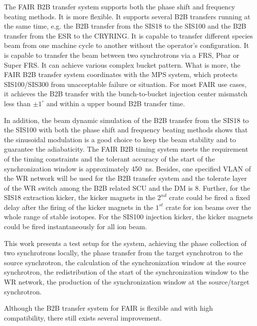 The FAIR B2B transfer system supports both the phase shift and frequency beating methods. It is more flexible. It supports several B2B transfers running at the same time, e.g. the B2B transfer from the SIS18 to the SIS100 and the B2B transfer from the ESR to the CRYRING. It is capable to transfer different species beam from one machine cycle to another without the operator’s configuration. It is capable to transfer the beam between two synchrotrons via a FRS, Pbar or Super FRS. It can achieve various complex bucket pattern. What is more, the FAIR B2B transfer system coordinates with the MPS system, which protects SIS100/SIS300 from unacceptable failure or situation. For most FAIR use cases, it achieves the B2B transfer with the bunch-to-bucket injection center mismatch less than $\pm1^\circ$ and within a upper bound B2B transfer time.

In addition, the beam dynamic simulation of the B2B transfer from the SIS18 to the SIS100 with both the phase shift and frequency beating methods shows that the sinusoidal modulation is a good choice to keep the beam stability and to guarantee the adiabaticity. The FAIR B2B timing system meets the requirement of the timing constraints and the tolerant accuracy of the start of the synchronization window is approximately \SI{450}{\ns}. Besides, one specified VLAN of the WR network will be used for the B2B transfer system and the tolerate layer of the WR switch among the B2B related SCU and the DM is 8.  Further, for the SIS18 extraction kicker, the kicker magnets in the $2^{nd}$ crate could be fired a fixed delay after the firing of the kicker magnets in the $1^{st}$ crate for ion beams over the whole range of stable isotopes. For the SIS100 injection kicker, the kicker magnets could be fired instantaneously for all ion beam. 

This work presents a test setup for the system, achieving the phase collection of two synchrotrons locally, the phase transfer from the target synchrotron to the source synchrotron, the calculation of the synchronization window at the source synchrotron, the redistribution of the start of the synchronization window to the WR network, the production of the synchronization window at the source/target synchrotron. 

Although the B2B transfer system for FAIR is flexible and with high compatibility, there still exists several improvement. 


